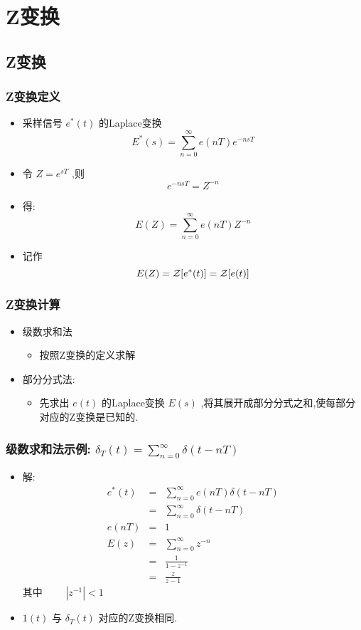 \documentclass[table]{article}
\begin{document}
\section{Z变换}
\label{sec-3}
\subsection{Z变换}
\label{sec-3-1}
\begin{frame}
\frametitle{Z变换定义}
\label{sec-3-1-1}

\begin{itemize}
\item 采样信号  $e^*(t)$  的Laplace变换  
       \[E^*(s)=\sum_{n=0}^{\infty}e(nT)e^{-nsT}\]
\item <2->令  $Z=e^{sT}$ ,则  
       \[e^{-nsT}=Z^{-n}\]
\item <3->得:  
       \[E(Z)=\sum_{n=0}^{\infty}e(nT)Z^{-n}\]
\item <3->记作  
       \[E(Z)={\cal Z}[e^*(t)]={\cal Z}[e(t)]\]
\end{itemize}
\end{frame}
\begin{frame}
\frametitle{Z变换计算}
\label{sec-3-1-2}

\begin{itemize}
\item 级数求和法
\begin{itemize}
\item 按照Z变换的定义求解
\end{itemize}
\item 部分分式法:
\begin{itemize}
\item 先求出  $e(t)$  的Laplace变换  $E(s)$  ,将其展开成部分分式之和,使每部分对应的Z变换是已知的.
\end{itemize}
\end{itemize}
\end{frame}
\begin{frame}
\frametitle{级数求和法示例: $\delta_T(t)=\sum_{n=0}^{\infty}\delta(t-nT)$}
\label{sec-3-1-3}

\begin{itemize}
\item <2->解:
      \begin{eqnarray*}
      e^*(t) & = & \sum_{n=0}^{\infty}e(nT)\delta(t-nT) \\
       &=& \sum_{n=0}^{\infty}\delta(t-nT) \\
      e(nT) &=& 1\\
      E(z) &=& \sum_{n=0}^{\infty}z^{-n}\\
       &=& \frac{1}{1-z^{-1}} \\
      &=& \frac{z}{z-1}
      \end{eqnarray*}
      其中 $\qquad |z^{-1}|<1$
\item <3->$1(t)$  与  $\delta_T(t)$  对应的Z变换相同.
\end{itemize}
\end{frame}
\end{document}
